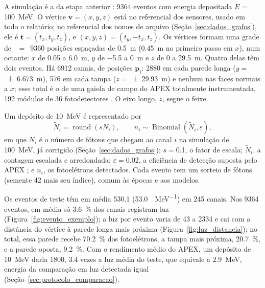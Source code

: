 A simulação é a da etapa anterior \cite{vicentin2024study}: \num{9364} eventos com energia depositada $E = {}$\qty{100}{\MeV}. O vértice $\mathbf{v} = (x, y, z)$ está no referencial dos sensores, usado em todo o relatório; no referencial dos nomes de arquivo (Seção~\ref{sec:dados_grafos}), ele é $\mathbf{t} = (t_x, t_y, t_z)$, e \mbox{$(x, y, z) = (t_y, -t_x, t_z)$}. Os vértices formam uma grade de ~$=$~\num{9360} posições espaçadas de \qty{0.5}{\m} (\qty{0.45}{\m} no primeiro passo em $x$), num octante: $x$ de \num{0.05} a \qty{6.0}{\m}, $y$ de \num{-5.5} a \qty{0}{\m} e $z$ de \num{0} a \qty{29.5}{\m}. Quatro delas têm dois eventos. Há \num{6912} canais, de posições $\mathbf{p}_i$: \num{2880} em cada parede longa ($y = {}$\qty{\pm 6.673}{\m}), \num{576} em cada tampa ($z = {}$\qty{\pm 29.93}{\m}) e nenhum nas faces normais a $x$; esse total é o de uma gaiola de campo do APEX totalmente instrumentada, \num{192} módulos de \num{36} fotodetectores \cite{abud2024dunephase}. O eixo longo, $z$, segue o feixe.

Um depósito de \qty{10}{\MeV} é representado por
\begin{equation}
  \tilde{N}_i = \operatorname{round}(s N_i), \qquad n_i \sim \operatorname{Binomial}(\tilde{N}_i, \varepsilon),
  \label{eq:luz}
\end{equation}
em que $N_i$ é o número de fótons que chegam ao canal $i$ na simulação de \qty{100}{\MeV}, já corrigido (Seção~\ref{sec:dados_grafos}); $s = {}$\num{0.1}, o fator de escala; $\tilde{N}_i$, a contagem escalada e arredondada; $\varepsilon = {}$\num{0.02}, a eficiência de detecção suposta pelo APEX \cite{marinho2025apex}; e $n_i$, os fotoelétrons detectados. Cada evento tem um sorteio de fótons (semente \num{42} mais seu índice), comum às épocas e aos modelos.

Os eventos de teste têm em média \qty{530.1}{\pe} (\qty{53.0}{\pe\per\MeV}) em \num{245} canais. Nos \num{9364} eventos, em média só \qty{3.6}{\percent} dos canais registram luz (Figura~\ref{fig:evento_exemplo}); a luz por evento varia de \num{43} a \qty{2334}{\pe} e cai com a distância do vértice à parede longa mais próxima (Figura~\ref{fig:luz_distancia}); no total, essa parede recebe \qty{70.2}{\percent} dos fotoelétrons, a tampa mais próxima, \qty{20.7}{\percent}, e a parede oposta, \qty{9.2}{\percent}. Com o rendimento médio do APEX, um depósito de \qty{10}{\MeV} daria \qty{1800}{\pe}, \num{3.4} vezes a luz média do teste, que equivale a \qty{2.9}{\MeV}, energia da comparação em luz detectada igual (Seção~\ref{sec:protocolo_comparacao}).

